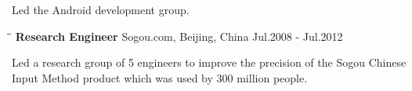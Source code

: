 \documentclass{res}
\begin{document}
\begin{resume}
\begin{tabbing}
   \end{tabbing}\vspace{-30pt}      %
   Led the Android development group. %
   \vspace{-0.1in}
   \begin{tabbing}
   \hspace{2in}\= \hspace{3in}\= \kill %
    {\bf Research Engineer} \>Sogou.com, Beijing, China     \>Jul.2008 - Jul.2012\\
   \end{tabbing}\vspace{-30pt}      %
   Led a research group of 5 engineers to improve the precision of the Sogou Chinese Input Method product which was used by 300 million people.


\end{resume}
\end{document}
